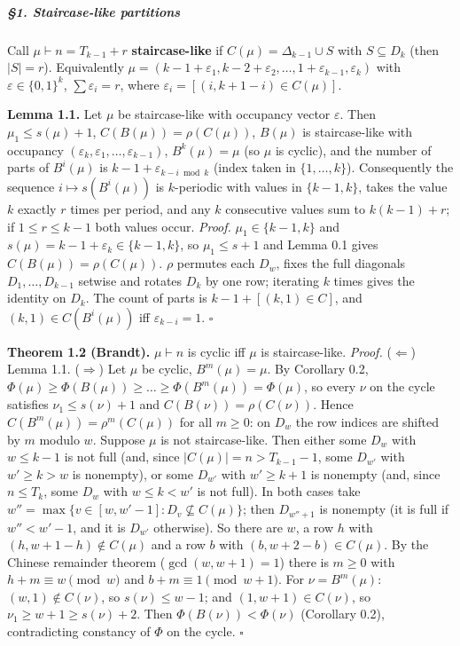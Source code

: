 \documentclass[11pt,a4paper]{article}
\begin{document}
\subparagraph{§1. Staircase-like
partitions}\label{staircase-like-partitions}

Call \(\mu\vdash n=T_{k-1}+r\) \textbf{staircase-like} if
\(C(\mu)=\Delta_{k-1}\cup S\) with \(S\subseteq D_k\) (then \(|S|=r\)).
Equivalently
\(\mu=(k-1+\varepsilon_1,k-2+\varepsilon_2,\dots,1+\varepsilon_{k-1},\varepsilon_k)\)
with \(\varepsilon\in\{0,1\}^k\), \(\sum\varepsilon_i=r\), where
\(\varepsilon_i=[(i,k+1-i)\in C(\mu)]\).

\textbf{Lemma 1.1.} Let \(\mu\) be staircase-like with occupancy vector
\(\varepsilon\). Then \(\mu_1\le s(\mu)+1\), \(C(B(\mu))=\rho(C(\mu))\),
\(B(\mu)\) is staircase-like with occupancy
\((\varepsilon_k,\varepsilon_1,\dots,\varepsilon_{k-1})\),
\(B^k(\mu)=\mu\) (so \(\mu\) is cyclic), and the number of parts of
\(B^i(\mu)\) is \(k-1+\varepsilon_{k-i \bmod k}\) (index taken in
\(\{1,\dots,k\}\)). Consequently the sequence \(i\mapsto s(B^i(\mu))\)
is \(k\)-periodic with values in \(\{k-1,k\}\), takes the value \(k\)
exactly \(r\) times per period, and any \(k\) consecutive values sum to
\(k(k-1)+r\); if \(1\le r\le k-1\) both values occur. \emph{Proof.}
\(\mu_1\in\{k-1,k\}\) and \(s(\mu)=k-1+\varepsilon_k\in\{k-1,k\}\), so
\(\mu_1\le s+1\) and Lemma 0.1 gives \(C(B(\mu))=\rho(C(\mu))\).
\(\rho\) permutes each \(D_w\), fixes the full diagonals
\(D_1,\dots,D_{k-1}\) setwise and rotates \(D_k\) by one row; iterating
\(k\) times gives the identity on \(D_k\). The count of parts is
\(k-1+[(k,1)\in C]\), and \((k,1)\in C(B^i(\mu))\) iff
\(\varepsilon_{k-i}=1\). \(\square\)

\textbf{Theorem 1.2 (Brandt).} \(\mu\vdash n\) is cyclic iff \(\mu\) is
staircase-like. \emph{Proof.} (\(\Leftarrow\)) Lemma 1.1.
(\(\Rightarrow\)) Let \(\mu\) be cyclic, \(B^m(\mu)=\mu\). By Corollary
0.2, \(\Phi(\mu)\ge\Phi(B(\mu))\ge\dots\ge\Phi(B^m(\mu))=\Phi(\mu)\), so
every \(\nu\) on the cycle satisfies \(\nu_1\le s(\nu)+1\) and
\(C(B(\nu))=\rho(C(\nu))\). Hence \(C(B^m(\mu))=\rho^m(C(\mu))\) for all
\(m\ge0\): on \(D_w\) the row indices are shifted by \(m\) modulo \(w\).
Suppose \(\mu\) is not staircase-like. Then either some \(D_w\) with
\(w\le k-1\) is not full (and, since \(|C(\mu)|=n>T_{k-1}-1\), some
\(D_{w'}\) with \(w'\ge k>w\) is nonempty), or some \(D_{w'}\) with
\(w'\ge k+1\) is nonempty (and, since \(n\le T_k\), some \(D_w\) with
\(w\le k<w'\) is not full). In both cases take
\(w''=\max\{v\in[w,w'-1]:D_v\not\subseteq C(\mu)\}\); then \(D_{w''+1}\)
is nonempty (it is full if \(w''<w'-1\), and it is \(D_{w'}\)
otherwise). So there are \(w\), a row \(h\) with
\((h,w+1-h)\notin C(\mu)\) and a row \(b\) with \((b,w+2-b)\in C(\mu)\).
By the Chinese remainder theorem (\(\gcd(w,w+1)=1\)) there is \(m\ge0\)
with \(h+m\equiv w\pmod w\) and \(b+m\equiv1\pmod{w+1}\). For
\(\nu=B^m(\mu)\): \((w,1)\notin C(\nu)\), so \(s(\nu)\le w-1\); and
\((1,w+1)\in C(\nu)\), so \(\nu_1\ge w+1\ge s(\nu)+2\). Then
\(\Phi(B(\nu))<\Phi(\nu)\) (Corollary 0.2), contradicting constancy of
\(\Phi\) on the cycle. \(\square\)
\end{document}

